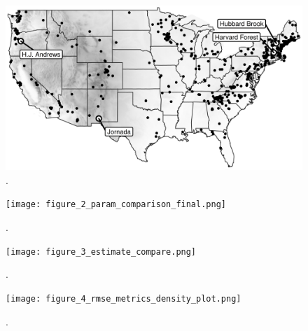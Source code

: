 \documentclass[fleqn,12pt,lineno]{article}
\begin{document}
\newpage


\begin{figure}[H]
	\centering
	\includegraphics[scale=0.6]{figure_1_site_map.png}
	\caption{.}
\end{figure}

\newpage

\begin{figure}[H]
	\centering
		\texttt{[image: figure\_2\_param\_comparison\_final.png]}
    \caption{.}
\end{figure}

\newpage


\begin{figure}[H]
	\centering
		\texttt{[image: figure\_3\_estimate\_compare.png]}
	\caption{.}
\end{figure}

\newpage


\begin{figure}[H]
	\centering
		\texttt{[image: figure\_4\_rmse\_metrics\_density\_plot.png]}
	\caption{.}
\end{figure}
\end{document}
